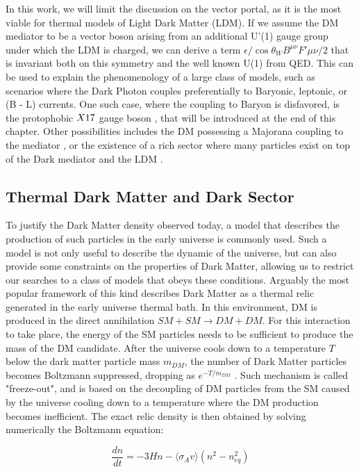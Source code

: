 In this work, we will limit the discussion on the vector portal, as it is the most viable for thermal models of Light Dark Matter (LDM). If we assume the DM mediator to be a vector boson arising from an additional U'(1) gauge group under which the LDM is charged, we can derive a term $\epsilon / \cos{\theta_W} B^{\mu \nu} F'{\mu \nu}/2$ that is invariant both on this symmetry and the well known U(1) from QED. This can be used to explain the phenomenology of a large class of models, such as scenarios where the Dark Photon couples preferentially to Baryonic, leptonic, or (B - L) currents. One such case, where the coupling to Baryon is disfavored, is the protophobic $X17$ gauge boson \cite{PhysRevD.95.035017}, that will be introduced at the end of this chapter. Other possibilities includes the DM possessing a Majorana coupling to the mediator \cite{PhysRevD.93.063523}, or the existence of a rich sector where many particles exist on top of the Dark mediator and the LDM \cite{Morrissey_2014}.

\subsection{Thermal Dark Matter and Dark Sector}
\label{ch1:sec:thermal-dm}

To justify the Dark Matter density observed today, a model that describes the production of such particles in the early universe is commonly used. Such a model is not only useful to describe the dynamic of the universe, but can also provide some constraints on the properties of Dark Matter, allowing us to restrict our searches to a class of models that obeys these conditions. Arguably the most popular framework of this kind describes Dark Matter as a thermal relic generated in the early universe thermal bath. In this environment, DM is produced in the direct annihilation $SM+SM \to DM+DM$. For this interaction to take place, the energy of the SM particles needs to be sufficient to produce the mass of the DM candidate. After the universe cools down to a temperature $T$ below the dark matter particle mass $m_{DM}$, the number of Dark Matter particles becomes Boltzmann suppressed, dropping as $e^{- T / m_{DM}}$ \cite{Feng:2010gw}. Such mechanism is called "freeze-out", and is based on the decoupling of DM particles from the SM caused by the universe cooling down to a temperature where the DM production becomes inefficient. The exact relic density is then obtained by solving numerically the Boltzmann equation:

  \begin{equation}
    \label{eq:boltzman-equation}
    \frac{d n}{d t} = -3 H n - \langle \sigma_A v \rangle (n^2 - n^2_{eq})
  \end{equation}

